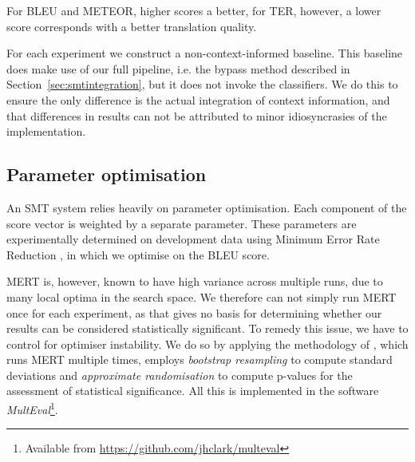 For BLEU and METEOR, higher scores a better, for TER, however, a lower score
corresponds with a better translation quality.

For each experiment we construct a non-context-informed baseline. This
baseline does make use of our full pipeline, i.e. the bypass method described
in Section~\ref{sec:smtintegration}, but it does not invoke the
classifiers.  We do this to ensure the only difference is the actual
integration of context information, and that differences in results can not be
attributed to minor idiosyncrasies of the implementation.


\subsection{Parameter optimisation}
\label{sec:paropt}

An SMT system relies heavily on parameter optimisation. Each component of the
score vector is weighted by a separate parameter. These parameters are
experimentally determined on development data using Minimum Error Rate
Reduction \citep{MERT}, in which we optimise on the BLEU score. 


MERT is, however, known to have high variance across multiple runs, due to many
local optima in the search space. We therefore can not simply run MERT once for
each experiment, as that gives no basis for determining whether our results can
be considered statistically significant. To remedy this issue, we have to
control for optimiser instability. We do so by applying the methodology of
\cite{MERTCONTROL}, which runs MERT multiple times, employs
\emph{bootstrap resampling} to compute standard deviations and
\emph{approximate randomisation} to compute p-values for the assessment of
statistical significance. All this is implemented in the software
\emph{MultEval}\footnote{Available from \url{https://github.com/jhclark/multeval}}.

